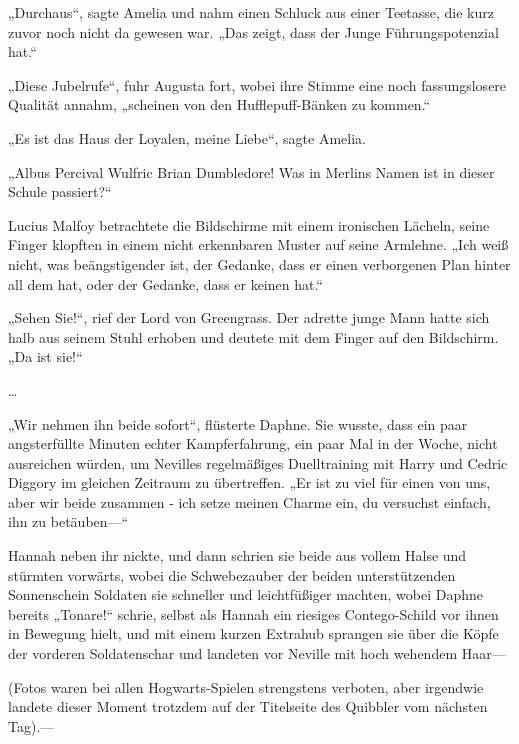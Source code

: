 {„Durchaus“, sagte Amelia und nahm einen Schluck aus einer Teetasse, die kurz zuvor noch nicht da gewesen war. „Das zeigt, dass der Junge Führungspotenzial hat.“

„Diese Jubelrufe“, fuhr Augusta fort, wobei ihre Stimme eine noch fassungslosere Qualität annahm, „scheinen von den Hufflepuff-Bänken zu kommen.“

„Es ist das Haus der Loyalen, meine Liebe“, sagte Amelia.

„Albus Percival Wulfric Brian Dumbledore! Was in Merlins Namen ist in dieser Schule passiert?“

Lucius Malfoy betrachtete die Bildschirme mit einem ironischen Lächeln, seine Finger klopften in einem nicht erkennbaren Muster auf seine Armlehne. „Ich weiß nicht, was beängstigender ist, der Gedanke, dass er einen verborgenen Plan hinter all dem hat, oder der Gedanke, dass er keinen hat.“

„Sehen Sie!“, rief der Lord von Greengrass. Der adrette junge Mann hatte sich halb aus seinem Stuhl erhoben und deutete mit dem Finger auf den Bildschirm. „Da ist sie!“

…

„Wir nehmen ihn beide sofort“, flüsterte Daphne. Sie wusste, dass ein paar angsterfüllte Minuten echter Kampferfahrung, ein paar Mal in der Woche, nicht ausreichen würden, um Nevilles regelmäßiges Duelltraining mit Harry und Cedric Diggory im gleichen Zeitraum zu übertreffen. „Er ist zu viel für einen von uns, aber wir beide zusammen - ich setze meinen Charme ein, du versuchst einfach, ihn zu betäuben—“

Hannah neben ihr nickte, und dann schrien sie beide aus vollem Halse und stürmten vorwärts, wobei die Schwebezauber der beiden unterstützenden Sonnenschein Soldaten sie schneller und leichtfüßiger machten, wobei Daphne bereits „Tonare!“ schrie, selbst als Hannah ein riesiges Contego-Schild vor ihnen in Bewegung hielt, und mit einem kurzen Extrahub sprangen sie über die Köpfe der vorderen Soldatenschar und landeten vor Neville mit hoch wehendem Haar—

(Fotos waren bei allen Hogwarts-Spielen strengstens verboten, aber irgendwie landete dieser Moment trotzdem auf der Titelseite des Quibbler vom nächsten Tag).—

}
